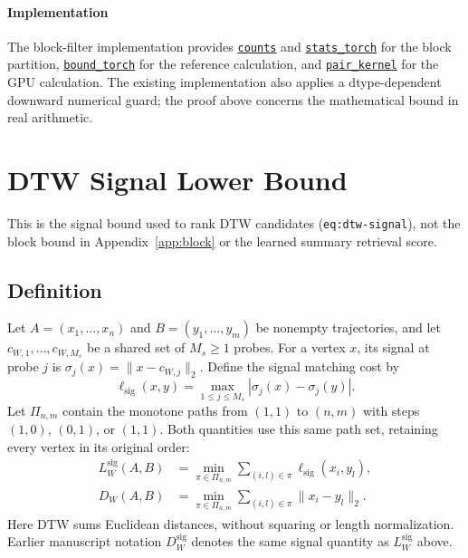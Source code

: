 \documentclass[10pt,conference,letterpaper]{IEEEtran}
\newcommand{\codefile}[2]{\href{https://github.com/DongXinfzu/LEAP/blob/main/#1}{\texttt{#2}}}
\begin{document}
\paragraph{Implementation}
The block-filter implementation provides
\codefile{01_LEAP/leap/dtw/dtw_probe_intervals.py}{counts} and
\codefile{01_LEAP/leap/dtw/dtw_probe_intervals.py}{stats\_torch}
for the block partition,
\codefile{01_LEAP/leap/dtw/dtw_probe_intervals.py}{bound\_torch}
for the reference calculation, and
\codefile{01_LEAP/leap/dtw/dtw_probe_intervals.py}{pair\_kernel}
for the GPU calculation. The existing implementation also applies a
dtype-dependent downward numerical guard; the proof above concerns the
mathematical bound in real arithmetic.

\section{DTW Signal Lower Bound}
\label{app:signal}

This is the signal bound used to rank DTW candidates
(\texttt{eq:dtw-signal}), not the block bound in Appendix~\ref{app:block}
or the learned summary retrieval score.

\subsection{Definition}
Let $A=(x_1,\ldots,x_n)$ and $B=(y_1,\ldots,y_m)$ be nonempty trajectories,
and let $c_{W,1},\ldots,c_{W,M_s}$ be a shared set of $M_s\geq1$ probes.
For a vertex $x$, its signal at probe $j$ is
$\sigma_j(x)=\lVert x-c_{W,j}\rVert_2$. Define the signal matching cost by
\begin{equation}
\ell_{\mathrm{sig}}(x,y)
=\max_{1\leq j\leq M_s}|\sigma_j(x)-\sigma_j(y)|.
\end{equation}
Let $\Pi_{n,m}$ contain the monotone paths from $(1,1)$ to $(n,m)$ with
steps $(1,0)$, $(0,1)$, or $(1,1)$. Both quantities use this same path set,
retaining every vertex in its original order:
\begin{equation}
\begin{aligned}
L_W^{\mathrm{sig}}(A,B)
&=\min_{\pi\in\Pi_{n,m}}\sum_{(i,l)\in\pi}
\ell_{\mathrm{sig}}(x_i,y_l),\\
D_W(A,B)
&=\min_{\pi\in\Pi_{n,m}}\sum_{(i,l)\in\pi}
\lVert x_i-y_l\rVert_2.
\end{aligned}
\end{equation}
Here DTW sums Euclidean distances, without squaring or length normalization.
Earlier manuscript notation $D_W^{\mathrm{sig}}$ denotes the same signal
quantity as $L_W^{\mathrm{sig}}$ above.
\end{document}
